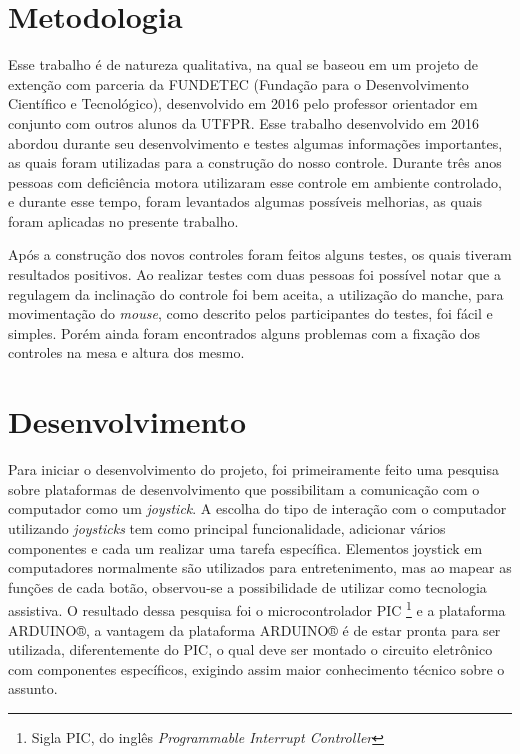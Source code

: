 \documentclass[
	12pt,			%
	openright,		%
	oneside,			%
	a4paper,			%
	chapter=TITLE,		%
	english,			%
	brazil,			%
	]{abntex2}
\begin{document}
\chapter{Metodologia}
\label{met}

Esse trabalho é de natureza qualitativa, na qual se baseou em um projeto de extenção com parceria da FUNDETEC (Fundação para o Desenvolvimento Científico e Tecnológico), desenvolvido em 2016 pelo professor orientador em conjunto com outros alunos da UTFPR. Esse trabalho desenvolvido em 2016 abordou durante seu desenvolvimento e testes algumas informações importantes, as quais foram utilizadas para a construção do nosso controle. Durante três anos pessoas com deficiência motora utilizaram esse controle em ambiente controlado, e durante esse tempo, foram levantados algumas possíveis melhorias, as quais foram aplicadas no presente trabalho.

Após a construção dos novos controles foram feitos alguns testes, os quais tiveram resultados positivos. Ao realizar testes com duas pessoas foi possível notar que a regulagem da inclinação do controle foi bem aceita, a utilização do manche, para movimentação do \emph{mouse}, como descrito pelos participantes do testes, foi fácil e simples. Porém ainda foram encontrados alguns problemas com a fixação dos controles na mesa e altura dos mesmo.

\chapter{Desenvolvimento}
\label{des}

Para iniciar o desenvolvimento do projeto, foi primeiramente feito uma pesquisa sobre plataformas de desenvolvimento que possibilitam a comunicação com o computador como um \emph{joystick}. A escolha do tipo de interação com o computador utilizando \emph{joysticks} tem como principal funcionalidade, adicionar vários componentes e cada um realizar uma tarefa específica. Elementos joystick em computadores normalmente são utilizados para entretenimento, mas ao mapear as funções de cada botão, observou-se a possibilidade de utilizar como tecnologia assistiva. O resultado dessa pesquisa foi o microcontrolador PIC \footnote{Sigla PIC, do inglês \emph{Programmable Interrupt Controller}} e a plataforma ARDUINO®, a vantagem da plataforma ARDUINO® é de estar pronta para ser utilizada, diferentemente do PIC, o qual deve ser montado o circuito eletrônico com componentes específicos, exigindo assim maior conhecimento técnico sobre o assunto.
\end{document}
